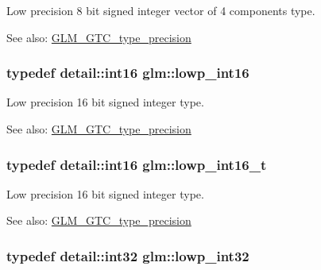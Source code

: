 Low precision 8 bit signed integer vector of 4 components type. \begin{Desc}
\item[See also:]\hyperlink{group__gtc__type__precision}{GLM\_\-GTC\_\-type\_\-precision} \end{Desc}
\hypertarget{group__gtc__type__precision_g71fc0c399fa4780507748b643733f153}{
\subsubsection[lowp\_\-int16]{\setlength{\rightskip}{0pt plus 5cm}typedef detail::int16 {\bf glm::lowp\_\-int16}}}
\label{group__gtc__type__precision_g71fc0c399fa4780507748b643733f153}


Low precision 16 bit signed integer type. \begin{Desc}
\item[See also:]\hyperlink{group__gtc__type__precision}{GLM\_\-GTC\_\-type\_\-precision} \end{Desc}
\hypertarget{group__gtc__type__precision_ge34c3d53c4c1434fc9f26538b0185667}{
\subsubsection[lowp\_\-int16\_\-t]{\setlength{\rightskip}{0pt plus 5cm}typedef detail::int16 {\bf glm::lowp\_\-int16\_\-t}}}
\label{group__gtc__type__precision_ge34c3d53c4c1434fc9f26538b0185667}


Low precision 16 bit signed integer type. \begin{Desc}
\item[See also:]\hyperlink{group__gtc__type__precision}{GLM\_\-GTC\_\-type\_\-precision} \end{Desc}
\hypertarget{group__gtc__type__precision_gd9939c9d6fec1c6accc02a83c6500f08}{
\subsubsection[lowp\_\-int32]{\setlength{\rightskip}{0pt plus 5cm}typedef detail::int32 {\bf glm::lowp\_\-int32}}}
\label{group__gtc__type__precision_gd9939c9d6fec1c6accc02a83c6500f08}



